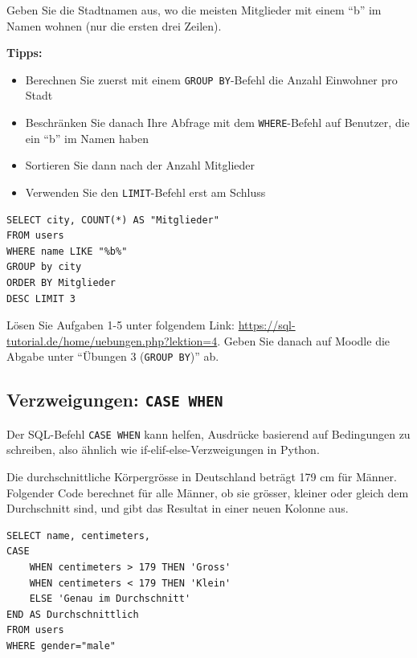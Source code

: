 \begin{mychallenge}
  Geben Sie die Stadtnamen aus, wo die meisten Mitglieder mit einem ``b'' im Namen wohnen (nur die ersten drei Zeilen).

  \textbf{Tipps:}
  \begin{itemize}
    \item Berechnen Sie zuerst mit einem \lstinline[style=sql]|GROUP BY|-Befehl die Anzahl Einwohner pro Stadt
    \item Beschränken Sie danach Ihre Abfrage mit dem \lstinline[style=sql]|WHERE|-Befehl auf Benutzer, die ein ``b'' im Namen haben
    \item Sortieren Sie dann nach der Anzahl Mitglieder
    \item Verwenden Sie den \lstinline[style=sql]|LIMIT|-Befehl erst am Schluss
  \end{itemize}

  \begin{myanswer}
    \begin{lstlisting}[style=sql]
SELECT city, COUNT(*) AS "Mitglieder"
FROM users 
WHERE name LIKE "%b%" 
GROUP by city 
ORDER BY Mitglieder
DESC LIMIT 3
\end{lstlisting}
  \end{myanswer}
\end{mychallenge}

\begin{mysubmission}
Lösen Sie Aufgaben 1-5 unter folgendem Link: \url{https://sql-tutorial.de/home/uebungen.php?lektion=4}. Geben Sie danach auf Moodle die Abgabe unter ``Übungen 3 (\lstinline[style=sql]|GROUP BY|)'' ab.
\end{mysubmission}

\subsection{Verzweigungen: \texorpdfstring{\lstinline[style=sql]|CASE WHEN|}{CASE WHEN}}

Der SQL-Befehl \lstinline[style=sql]|CASE WHEN| kann helfen, Ausdrücke basierend auf Bedingungen zu schreiben, also ähnlich wie if-elif-else-Verzweigungen in Python.

\begin{myexample}
Die durchschnittliche Körpergrösse in Deutschland beträgt 179 cm für Männer. Folgender Code berechnet für alle Männer, ob sie grösser, kleiner oder gleich dem Durchschnitt sind, und gibt das Resultat in einer neuen Kolonne aus.

\begin{lstlisting}[style=sql]
SELECT name, centimeters,
CASE 
	WHEN centimeters > 179 THEN 'Gross'
    WHEN centimeters < 179 THEN 'Klein'
    ELSE 'Genau im Durchschnitt'
END AS Durchschnittlich
FROM users
WHERE gender="male"
\end{lstlisting}
\end{myexample}

